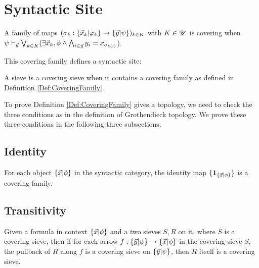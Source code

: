 \section{Syntactic Site}
\begin{definition}
  \label{Def:CoveringFamily}
  \leanok
  A family of maps $(\sigma_k : \{ \vec{x}_k | \varphi_k \}\to \{ \vec{y} | \psi \})_{k \in K}$ with $K \in \mathscr{U}$ is covering when
  $\psi \vdash_{\vec{y}} \bigvee_{k \in K} (\exists \vec{x}_k, \phi \wedge \bigwedge_{i \in \vec{y}} y_i = x_{\sigma_{k(i)}}$).
\end{definition}

This covering family defines a syntactic site:

\begin{definition}
  A sieve is a covering sieve when it contains a covering family as defined in Definition \ref{Def:CoveringFamily}. 
\end{definition}

To prove Definition \ref{Def:CoveringFamily} gives a topology, we need to check the three conditions as in the definition of Grothendieck
topology.
We prove these three conditions in the following three subsections.

\subsection{Identity}
\begin{lemma}
  For each object $\{ \vec{x} | \phi \}$ in the syntactic category, the identity map $\{\mathbf{1}_{\{ \vec{x} | \phi \}}\}$ is a covering family.
\end{lemma}

\subsection{Transitivity}
\begin{lemma}[Transitivity]
  Given a formula in context $\{ \vec{x} | \phi \}$ and a two sieves $S,R$ on it, where $S$ is a covering sieve, then if for each arrow $f:\{ \vec{y} | \psi \}\to\{ \vec{x} | \phi \}$ in the
  covering sieve $S$, the pullback of $R$ along $f$ is a covering sieve on $\{ \vec{y} | \psi \}$, then $R$ itself is a covering sieve.
\end{lemma}


